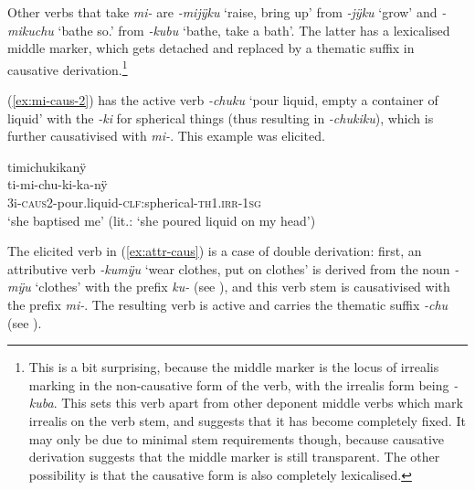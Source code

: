 Other verbs that take \textit{mi-} are \textit{-mijÿku} ‘raise, bring up’ from \textit{-jÿku} ‘grow’ and \textit{-mikuchu} ‘bathe so.’ from \textit{-kubu} ‘bathe, take a bath’. The latter has a lexicalised middle marker, which gets detached and replaced by a thematic suffix in causative derivation.\footnote{This is a bit surprising, because the middle marker is the locus of irrealis marking in the non-causative form of the verb, with the irrealis form being \textit{-kuba}. This sets this verb apart from other deponent middle verbs which mark irrealis on the verb stem, and suggests that it has become completely fixed. It may only be due to minimal stem requirements though, because causative derivation suggests that the middle marker is still transparent. The other possibility is that the causative form is also completely lexicalised.}  %


(\ref{ex:mi-caus-2}) has the active verb \textit{-chuku} ‘pour liquid, empty a container of liquid’ with the  \textit{-ki} for spherical things (thus resulting in \textit{-chukiku}), which is further causativised with \textit{mi-}. This example was elicited.

\ea\label{ex:mi-caus-2}
\begingl
\glpreamble timichukikanÿ\\
\gla ti-mi-chu-ki-ka-nÿ\\
\glb 3i-\textsc{caus}2-pour.liquid-\textsc{clf:}spherical-\textsc{th}1\textsc{.irr}-1\textsc{sg}\\
\glft ‘she baptised me’ (lit.: ‘she poured liquid on my head’)
\endgl
\trailingcitation{[jxx-e081025s-1.052]}
\xe

The elicited verb in (\ref{ex:attr-caus}) is a case of double derivation: first, an attributive verb \textit{-kumÿu} ‘wear clothes, put on clothes’ is derived from the noun \textit{-mÿu} ‘clothes’ with the prefix \textit{ku-} (see ), and this verb stem is causativised with the prefix \textit{mi-}. The resulting verb is active and carries the thematic suffix \textit{-chu} (see ).

